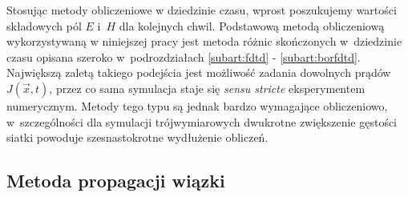 
Stosując metody obliczeniowe w dziedzinie czasu, wprost poszukujemy wartości składowych pól $E$ i~$H$ dla kolejnych chwil. Podstawową metodą obliczeniową wykorzystywaną w niniejszej pracy jest metoda różnic skończonych w~dziedzinie czasu opisana szeroko w~podrozdziałach \ref{subart:fdtd} - \ref{subart:borfdtd}. Największą zaletą takiego podejścia jest możliwość zadania dowolnych prądów $J(\vec{x},t)$, przez co sama symulacja staje się \textit{sensu stricte} eksperymentem numerycznym. Metody tego typu są jednak bardzo wymagające obliczeniowo, w~szczególności dla symulacji trójwymiarowych dwukrotne zwiększenie gęstości siatki powoduje szesnastokrotne wydłużenie obliczeń. 

\subsection{Metoda propagacji wiązki} 

